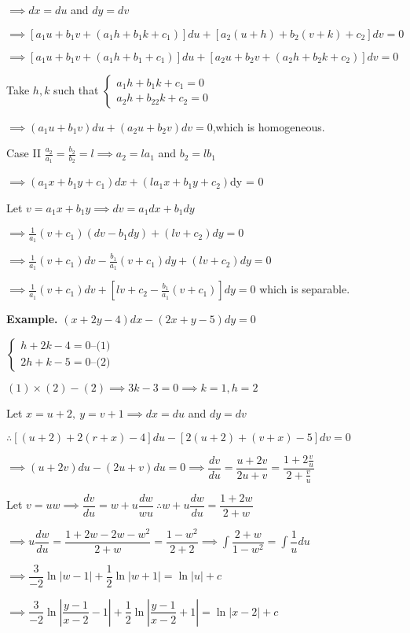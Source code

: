 $\implies dx = du $ and $dy = dv $

$\implies [a_1u+b_1v+(a_1h+b_1k+c_1)]du + [a_2(u+h)+b_2(v+k)+c_2]dv = 0$

$\implies [a_1u + b_1 v + (a_1h+b_1+c_1)]du + [a_2u+b_2v+(a_2h+b_2k+c_2)]dv = 0$

Take $h,k$ such that $\begin{cases}
	a_1 h + b_1 k + c_1 = 0\\
	a_2 h + b_22k + c_2 = 0
\end{cases}$

$\implies (a_1u + b_1v)du + (a_2u+b_2v)dv = 0$,which is homogeneous.

Case II $\frac{a_2}{a_1} = \frac{b_2}{b_2} = l \implies a_2 = la_1 $ and $ b_2 = lb_1$

$\implies (a_1 x + b_1y + c_1)dx + (la_1x + b_1y + c_2)$dy = 0

Let $v = a_1 x + b_1y \implies dv = a_1 dx + b_1dy $

$\implies \frac{1}{a_1}(v+c_1)(dv - b_1dy) + (lv + c_2)dy = 0$

$\implies \frac{1}{a_1}(v+c_1)dv - \frac{b_1}{a_1}(v + c_1)dy + (lv + c_2)dy = 0$

$\implies \frac{1}{a_1}(v+c_1)dv + [lv + c_2 - \frac{b_1}{a_1}(v + c_1)]dy = 0$ which is separable.

\textbf{Example.} $(x+2y - 4)dx - (2x + y-5)dy = 0$

\begin{solution}
	$\begin{cases}
		h + 2k - 4 = 0 \text{--(1)}\\
		2h + k - 5 = 0 \text{--(2)}
	\end{cases}$
	
	$(1) \times (2) - (2) \implies 3k - 3 = 0 \implies k = 1,h = 2$
	
	Let $x = u+2,~y=v+1 \implies dx = du $ and $dy = dv$
	
	$\therefore [(u+2)+ 2(r+x) - 4]du - [2(u+2) + (v + x) - 5]dv = 0$
	
	$\implies (u+2v)du - (2u + v)du = 0 \implies \dfrac{dv}{du} = \dfrac{u + 2v}{2u + v} = \dfrac{1 + 2\frac{v}{u}}{2 + \frac{v}{u}}$
	
	Let $v = uw \implies \dfrac{dv}{du} = w+u\dfrac{dw}{wu}~\therefore w + u\dfrac{dw}{du} = \dfrac{1 + 2w}{2 + w} $
	
	$\implies u \dfrac{dw}{du} = \dfrac{1 + 2w - 2w - w^2}{2 + w} = \dfrac{1 - w^2}{2+2} \implies \int \dfrac{2 + w}{1-w^2} = \int \dfrac{1}{u}du$
	
	$\implies \dfrac{3}{-2}\ln|w-1| + \dfrac{1}{2}\ln|w+1| = \ln |u| + c$
	
	$\implies \dfrac{3}{-2}\ln|\dfrac{y-1}{x-2} - 1| + \dfrac{1}{2} \ln|\dfrac{y-1}{x-2} + 1 | = \ln|x-2| + c$
\end{solution}

